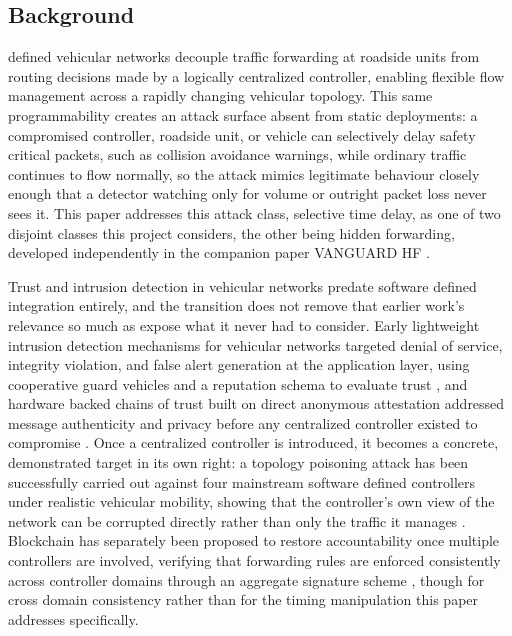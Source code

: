 \documentclass[final,5p,twocolumn]{elsarticle}
\theoremstyle{remark}
\theoremstyle{plain}
\begin{document}
\subsection{Background}

 defined vehicular networks decouple traffic forwarding at
roadside units from routing decisions made by a logically centralized
controller, enabling flexible flow management across a rapidly changing
vehicular topology. This same programmability creates an attack surface
absent from static deployments: a compromised controller, roadside unit,
or vehicle can selectively delay safety critical packets, such as
collision avoidance warnings, while ordinary traffic continues to flow
normally, so the attack mimics legitimate behaviour closely enough that a
detector watching only for volume or outright packet loss never sees it.
This paper addresses this attack class, selective time delay, as one of
two disjoint classes this project considers, the other being hidden
forwarding, developed independently in the companion paper VANGUARD HF
\cite{VanguardHF2026}.

Trust and intrusion detection in vehicular networks predate software
defined integration entirely, and the transition does not remove that
earlier work's relevance so much as expose what it never had to consider.
Early lightweight intrusion detection mechanisms for vehicular networks
targeted denial of service, integrity violation, and false alert
generation at the application layer, using cooperative guard vehicles and
a reputation schema to evaluate trust \cite{Sedjelmaci2014}, and hardware
backed chains of trust built on direct anonymous attestation addressed
message authenticity and privacy before any centralized controller existed
to compromise \cite{Sumra2011}. Once a centralized controller is
introduced, it becomes a concrete, demonstrated target in its own right: a
topology poisoning attack has been successfully carried out against four
mainstream software defined controllers under realistic vehicular
mobility, showing that the controller's own view of the network can be
corrupted directly rather than only the traffic it manages
\cite{Wang2020Topology}. Blockchain has separately been proposed to
restore accountability once multiple controllers are involved, verifying
that forwarding rules are enforced consistently across controller domains
through an aggregate signature scheme \cite{Li2022BlockREV}, though for
cross domain consistency rather than for the timing manipulation this
paper addresses specifically.
\end{document}
